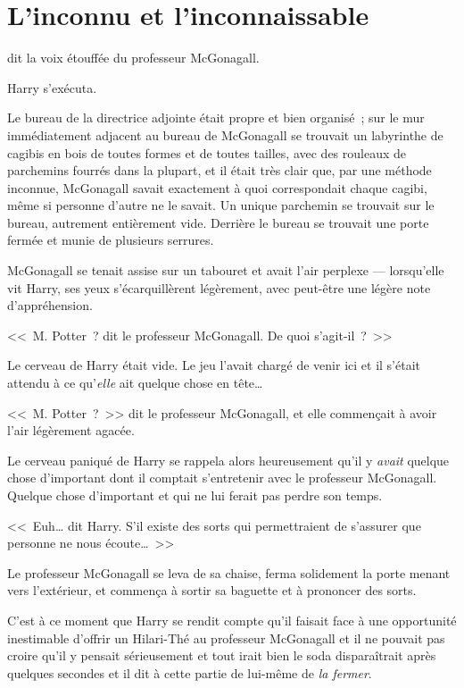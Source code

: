 \chapter{L'inconnu et l'inconnaissable}

 dit la voix étouffée du professeur McGonagall.

\hplettrineextrapara
Harry s'exécuta.

Le bureau de la directrice adjointe était propre et bien organisé~; sur le mur immédiatement adjacent au bureau de McGonagall se trouvait un labyrinthe de cagibis en bois de toutes formes et de toutes tailles, avec des rouleaux de parchemins fourrés dans la plupart, et il était très clair que, par une méthode inconnue, McGonagall savait exactement à quoi correspondait chaque cagibi, même si personne d'autre ne le savait. Un unique parchemin se trouvait sur le bureau, autrement entièrement vide. Derrière le bureau se trouvait une porte fermée et munie de plusieurs serrures.

McGonagall se tenait assise sur un tabouret et avait l'air perplexe — lorsqu'elle vit Harry, ses yeux s'écarquillèrent légèrement, avec peut-être une légère note d'appréhension.

<<~M. Potter~? dit le professeur McGonagall. De quoi s'agit-il~?~>>

Le cerveau de Harry était vide. Le jeu l'avait chargé de venir ici et il s'était attendu à ce qu'\emph{elle} ait quelque chose en tête…

<<~M. Potter~?~>> dit le professeur McGonagall, et elle commençait à avoir l'air légèrement agacée.

Le cerveau paniqué de Harry se rappela alors heureusement qu'il y \emph{avait} quelque chose d'important dont il comptait s'entretenir avec le professeur McGonagall. Quelque chose d'important et qui ne lui ferait pas perdre son temps.

<<~Euh… dit Harry. S'il existe des sorts qui permettraient de s'assurer que personne ne nous écoute…~>>

Le professeur McGonagall se leva de sa chaise, ferma solidement la porte menant vers l'extérieur, et commença à sortir sa baguette et à prononcer des sorts.

C'est à ce moment que Harry se rendit compte qu'il faisait face à une opportunité inestimable d'offrir un Hilari-Thé au professeur McGonagall et il ne pouvait pas croire qu'il y pensait sérieusement et tout irait bien le soda disparaîtrait après quelques secondes et il dit à cette partie de lui-même de \emph{la fermer}.

